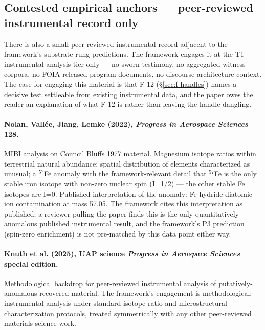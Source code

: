 \documentclass[11pt,a4paper]{article}
\begin{document}
\subsection*{Contested empirical anchors --- peer-reviewed instrumental record only}\label{sec:contested-instrumental}

There is also a small peer-reviewed instrumental record adjacent to the framework's substrate-rung predictions. The framework engages it at the T1 instrumental-analysis tier only --- no sworn testimony, no aggregated witness corpora, no FOIA-released program documents, no discourse-architecture context. The case for engaging this material is that F-12 (\S\ref{sec:f-handles}) names a decisive test settleable from existing instrumental data, and the paper owes the reader an explanation of what F-12 is rather than leaving the handle dangling.

\paragraph{Nolan, Vall\'ee, Jiang, Lemke (2022), \emph{Progress in Aerospace Sciences} 128.} MIBI analysis on Council Bluffs 1977 material. Magnesium isotope ratios within terrestrial natural abundance; spatial distribution of elements characterized as unusual; a $^{57}$Fe anomaly with the framework-relevant detail that $^{57}$Fe is the only stable iron isotope with non-zero nuclear spin (I=1/2) --- the other stable Fe isotopes are I=0. Published interpretation of the anomaly: Fe-hydride diatomic-ion contamination at mass 57.05. The framework cites this interpretation as published; a reviewer pulling the paper finds this is the only quantitatively-anomalous published instrumental result, and the framework's P3 prediction (spin-zero enrichment) is not pre-matched by this data point either way.

\paragraph{Knuth et al. (2025), UAP science \emph{Progress in Aerospace Sciences} special edition.} Methodological backdrop for peer-reviewed instrumental analysis of putatively-anomalous recovered material. The framework's engagement is methodological: instrumental analysis under standard isotope-ratio and microstructural-characterization protocols, treated symmetrically with any other peer-reviewed materials-science work.
\end{document}
